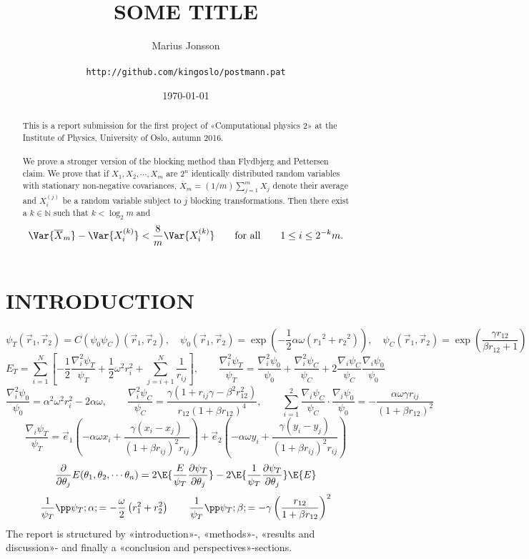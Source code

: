 \documentclass[11pt,english,a4paper]{article}
\author{\normalsize Marius Jonsson \\\\
\vspace{5px}
\normalsize \texttt{http://github.com/kingoslo/postmann.pat}}
\title{\bf \uppercase{Some title}}
\date{\normalsize \today}
\begin{document}
\maketitle
\begin{abstract} \normalsize This is a report submission for the first project of «Computational physics 2» at the Institute of Physics, University of Oslo, autumn 2016.\\
\\
We prove a stronger version of the blocking method than Flydbjerg and Pettersen claim. We prove that if $X_1,X_2,\cdots, X_m$ are $2^n$ identically distributed random variables with stationary non-negative covariances, $\overline X_m = (1/m)\sum_{j=1}^m X_j$ denote their average and $X^{(j)}_i$ be a random variable subject to $j$ blocking transformations. Then there exist a $k \in \mathbb{N}$ such that $k < \log_2 m$ and
\[
\Var{\overline X_m} - \Var{X^{(k)}_i} < \frac{8}{m}\Var{X^{(k)}_i} \qquad \text{for all} \qquad 1 \leq i \leq 2^{-k}m.
\]
\end{abstract}
\lstset{
  xleftmargin=.2\textwidth, xrightmargin=.2\textwidth
}

\section*{\uppercase{Introduction}}
\[
\psi_T(\vec{r}_1, \vec{r}_2) = C(\psi_0 \psi_C)(\vec{r}_1, \vec{r}_2), \quad  \psi_0(\vec{r}_1, \vec{r}_2) = \exp \left(-\frac{1}{2} \alpha  \omega  \left( {{r}_1}^2+  {{r}_2}^2\right)\right),  \quad  \psi_C(\vec{r}_1, \vec{r}_2) =  \exp \left( \frac{\gamma r_{  12}}{\beta  r_{  12}+1} \right)
\]
\[
E_T = \sum_{i=1}^N \left[ -\frac{1}{2} \frac{\nabla^2_i \psi_T}{\psi_T} + \frac{1}{2} \omega^2 r_i^2 + \sum_{j=i+1}^N \frac{1}{r_{ij}} \right], \qquad \frac{\nabla_i^2 \psi_T}{\psi_T} = \frac{\nabla_i^2 \psi_0}{\psi_0} + \frac{\nabla_i^2 \psi_C}{\psi_C} + 2\frac{\nabla_i \psi_C}{\psi_C}\frac{\nabla_i \psi_0}{\psi_0}
\]
\[
\frac{\nabla_i^2 \psi_0}{\psi_0} = \alpha^2 \omega^2 r_i^2 - 2 \alpha \omega, \qquad
\frac{\nabla_i^2 \psi_C}{\psi_C} = \frac{\gamma (1 + r_{ij} \gamma - \beta^2 r_{  12}^2)}{r_{  12}(1 + \beta r_{  12})^4}, \qquad \sum_{i=1}^2 \frac{\nabla_i \psi_C}{\psi_C}\cdot \frac{\nabla_i \psi_0}{\psi_0} = - \frac{\alpha \omega \gamma r_{ij}}{(1 + \beta r_{12})^2}
\]
\[
\frac{\nabla_i \psi_T}{\psi_T} = \vec{e}_1 \left( -\alpha \omega x_i + \frac{\gamma(x_i - x_j)}{(1 + \beta r_{ij})^2r_{ij}} \right) + \vec{e}_2 \left( - \alpha \omega y_i + \frac{\gamma(y_i-y_j)}{(1 + \beta r_{ij})^2r_{ij}} \right)
\]
\[
\frac{\partial}{\partial \theta_j} E(\theta_1,\theta_2,\cdots \theta_n) = 2 \E{\frac{E}{\psi_T} \frac{\partial \psi_T}{\partial \theta_j} } - 2\E{\frac{1}{\psi_T} \frac{\partial \psi_T}{\partial \theta_j} }\E{E}
\]
\[
\frac{1}{\psi_T}\pp \psi_T; \alpha; = - \frac{\omega}{2} \left( r_1^2 + r_2^2 \right) \qquad 
\frac{1}{\psi_T}\pp \psi_T; \beta; = - \gamma \left( \frac{r_{12}}{1 + \beta r_{12}} \right)^2
\]
The report is structured by «introduction»-, «methods»-, «results and discussion»- and finally a «conclusion and perspectives»-sections.
\end{document}
